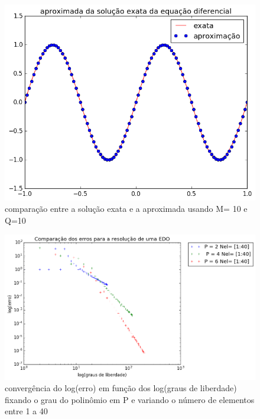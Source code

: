 \begin{figure}[!ht]
  \includegraphics[width=1\textwidth,center]{figuras/solu_edo_simul.png}
  \caption{comparação entre a solução exata e a aproximada usando M= 10 e Q=10}
\end{figure}

\begin{figure}[!hb]
  \includegraphics[width=1\textwidth,center]{figuras/convergencia_erro_EDO_h.png}
  \caption{convergência do log(erro) em função dos log(graus de liberdade) fixando o grau do polinômio em P e variando o número de elementos entre 1 a 40 }
\end{figure}


